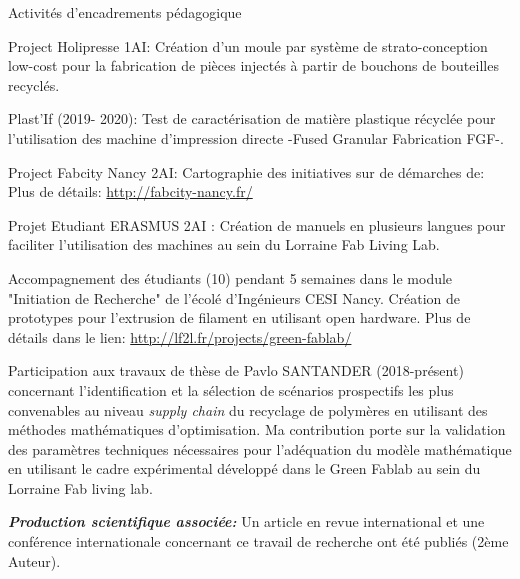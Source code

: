 \begin{rubric}{Activités d'encadrements pédagogique}
\entry*[2017-2018] 

Project Holipresse 1AI: Création d'un moule par système de strato-conception low-cost pour la fabrication de pièces injectés à partir de bouchons de bouteilles recyclés. 

\entry*[2019-2020] 
Plast'If (2019- 2020): Test de caractérisation de matière plastique récyclée pour l'utilisation des machine d'impression directe -Fused Granular Fabrication FGF-.


\entry*[2017-2018] 
Project Fabcity Nancy 2AI: Cartographie des initiatives sur de démarches de: 
Plus de détails: \url{http://fabcity-nancy.fr/}

\entry*[] 
Projet Etudiant ERASMUS 2AI : Création de manuels en plusieurs langues pour faciliter l'utilisation des machines au sein du Lorraine Fab Living Lab.

\entry*[] 
Accompagnement des étudiants (10) pendant 5 semaines dans le module "Initiation de Recherche" de l'écolé d'Ingénieurs CESI Nancy. 
Création de prototypes pour l'extrusion de filament en utilisant open hardware.
Plus de détails dans le lien:
\url{http://lf2l.fr/projects/green-fablab/} 



\entry*[2018- présent]
Participation aux travaux de thèse de Pavlo SANTANDER (2018-présent) concernant l'identification et la sélection de scénarios prospectifs les plus convenables au niveau \textit{supply chain} du recyclage de polymères en utilisant des méthodes mathématiques d'optimisation.
Ma contribution porte sur la validation des paramètres techniques nécessaires pour l'adéquation du modèle mathématique en utilisant le cadre expérimental développé dans le Green Fablab au sein du Lorraine Fab living lab.\newline

\textit{\textbf{Production scientifique associée:}} Un article en revue international et une conférence internationale concernant ce travail de recherche ont été publiés (2ème Auteur).


\end{rubric}

